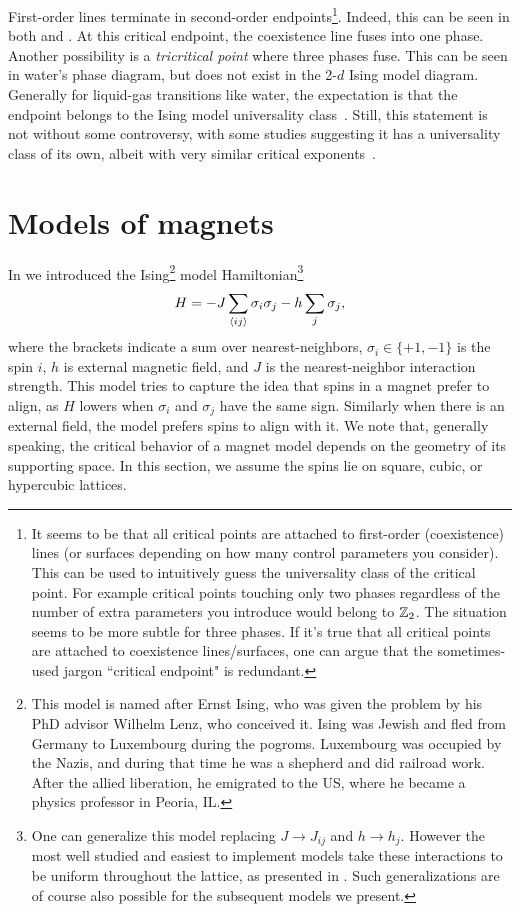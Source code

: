 First-order lines terminate in second-order 
endpoints\footnote{It seems to be that
all critical points are attached to first-order (coexistence) lines
(or surfaces depending on how many control parameters you consider).
This can be used to intuitively guess the universality class of
the critical point. For example critical points touching only two phases
regardless of the number of extra parameters you introduce would
belong to $\mathbb{Z}_2$. The situation seems to be more subtle for three phases.
If it's true that all critical points are attached to coexistence
lines/surfaces, one can argue that the sometimes-used jargon
``critical endpoint" is redundant.}.
Indeed, this
can be seen in both  and .
At this critical endpoint, the coexistence line fuses into one phase.
Another possibility is a {\it tricritical point}
where three phases fuse. This can be seen in water's phase diagram, but
does not exist in the 2-$d$ Ising model diagram.
Generally for liquid-gas transitions like
water, the expectation is that the endpoint belongs to the Ising
model universality
class~\cite{hubbard_wilson_1972,bruce_scaling_1992,wilding_critical-point_1995,yarmolinsky_revisiting_2017}.
Still, this statement is not without some controversy, with some studies suggesting
it has a universality class of its own, albeit with very similar
critical exponents~\cite{valls_liquid-gas_1978}.

\section{Models of magnets}

In  we introduced the Ising\footnote{This
model is named after Ernst Ising, who was given the problem by his
PhD advisor Wilhelm Lenz, who conceived it. Ising was Jewish and
fled from Germany to Luxembourg during the pogroms. Luxembourg was
occupied by the Nazis, and during that time he was a shepherd and did
railroad work. After the allied liberation, he emigrated to the US,
where he became a physics professor in Peoria, IL.} model 
Hamiltonian\footnote{One can generalize this model replacing
$J\to J_{ij}$ and $h\to h_j$. However the most well studied and easiest
to implement models take these interactions to be uniform throughout
the lattice, as presented in . Such generalizations
are of course also possible for the subsequent models we present.}
\begin{equation}\label{eq:ising}
H=-J\sum_{\ev{i j}} \sigma_i \sigma_j-h \sum_j
\sigma_j,
\end{equation}
where the brackets indicate a sum over nearest-neighbors,
$\sigma_i\in\{+1,-1\}$ is the spin $i$, $h$ is 
external magnetic field, and $J$ is the
nearest-neighbor interaction strength. 
This model tries to capture the
idea that spins in a magnet prefer to align, as $H$ lowers when
$\sigma_i$ and $\sigma_j$ have the same sign. Similarly when there
is an external field, the model prefers spins to align with it.
We note that, generally speaking, the critical behavior of a magnet model
depends on the geometry of its supporting space. In this section, we assume the
spins lie on square, cubic, or hypercubic lattices.

